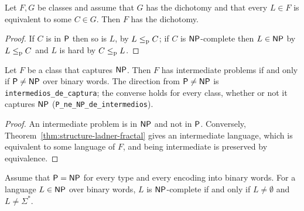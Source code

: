 \begin{theorem}
  \label{thm:structure-dicotomia-equiv}
  \leanok
  Let $F, G$ be classes and assume that $G$ has the dichotomy and that every $L \in F$ is
  equivalent to some $C \in G$. Then $F$ has the dichotomy.
  \own{}
\end{theorem}

\begin{proof}
  \leanok
  If $C$ is in $\mathsf{P}$ then so is $L$, by $L \le_{\mathrm{p}} C$; if $C$ is $\cNP$-complete then $L \in \mathsf{NP}$ by
  $L \le_{\mathrm{p}} C$ and $L$ is hard by $C \le_{\mathrm{p}} L$.
\end{proof}

\begin{theorem}
  \label{thm:structure-captura-iff}
  \leanok
  Let $F$ be a class that captures $\cNP$. Then $F$ has intermediate problems if and only if $\mathsf{P} \neq
  \mathsf{NP}$ over binary words. The direction from $\mathsf{P} \neq \mathsf{NP}$ is \texttt{intermedios\_de\_captura}; the
  converse holds for every class, whether or not it captures $\cNP$ (\texttt{P\_ne\_NP\_de\_intermedios}).
  \own{}
\end{theorem}

\begin{proof}
  \leanok
  An intermediate problem is in $\cNP$ and not in $\mathsf{P}$. Conversely, Theorem~\ref{thm:structure-ladner-fractal}
  gives an intermediate language, which is equivalent to some language of $F$, and being intermediate
  is preserved by equivalence.
\end{proof}

\begin{theorem}[If $\cP = \cNP$, a language of $\cNP$ is complete exactly when it is non-trivial]
  \label{thm:structure-completo-no-trivial}
  \leanok
  Assume that $\cP = \cNP$ for every type and every encoding into binary words. For a language $L
  \in \mathsf{NP}$ over binary words, $L$ is $\cNP$-complete if and only if $L \neq \emptyset$ and $L \neq
  \Sigma^*$.
  \own{}
\end{theorem}

